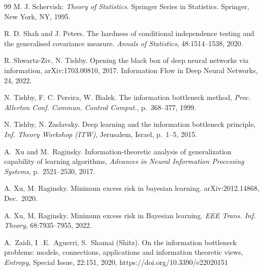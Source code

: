 \documentclass[11pt]{article}
\newcounter{aid}
\begin{document}
\begin{thebibliography}{99}
 M. J. Schervish:  \emph{Theory of Statistics}.  Springer Series in Statistics. Springer, New York, NY, 1995. 

R. D. Shah and J. Peters.
The hardness of conditional independence testing and the
generalised covariance measure.
{\it Annals of Statistics}, 48:1514--1538, 2020.

R. Shwartz-Ziv, N. Tishby. Opening the black box of deep neural networks via information,  arXiv:1703.00810, 2017. Information Flow in Deep Neural Networks, 24, 2022.


N. Tishby, F. C. Pereira,  W. Bialek. The information bottleneck method, \emph{Proc. Allerton Conf. Commun. Control Comput.}, p.~368–377, 1999. 

N. Tishby, N. Zaslavsky. Deep learning and the information bottleneck principle, \emph{Inf. Theory Workshop (ITW)}, Jerusalem, Israel,  p.~1--5, 2015. 





A.~Xu and M.~Raginsky. Information-theoretic analysis of
  generalization capability of learning algorithms, \emph{Advances in
    Neural Information Processing Systems},  p.~2521--2530, 2017.

 A. Xu, M. Raginsky. Minimum excess risk in bayesian learning.  arXiv:2012.14868, Dec.\ 2020.

 A. Xu, M. Raginsky. Minimum excess risk in Bayesian learning. \emph{EEE Trans. Inf. Theory}, 68:7935--7955, 2022.





 A.~Zaidi, I~.E.~Aguerri, S.~Shamai (Shitz). On the
 information bottleneck problems: models, connections, applications and
 information theoretic views, \emph{Entropy}, Special Issue, 22:151, 
 2020, https://doi.org/10.3390/e22020151

\end{thebibliography}
\end{document}
